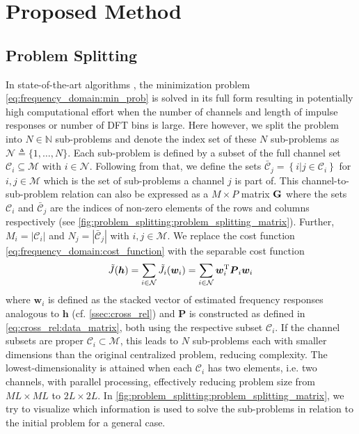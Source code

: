 \documentclass{article}
\newcommand{\hf}{{\bm{h}}}
\newcommand{\wf}{{\bm{w}}}
\newcommand{\aRhof}{{\bm{{P}}}}
\newcommand{\Cset}{\mathcal{C}}
\newcommand{\Csetb}{\bar{\mathcal{C}}}
\newcommand{\Mset}{\mathcal{M}}
\newcommand{\Nset}{\mathcal{N}}
\begin{document}
\section{Proposed Method}
\label{sec:proposed_method}

\subsection{Problem Splitting}
\label{ssec:problem_splitting}
In state-of-the-art algorithms \cite{heNoiseRobustFrequencyDomain2018,habetsOnlineQuasiNewtonAlgorithm2010}, the minimization problem \eqref{eq:frequency_domain:min_prob} is solved in its full form resulting in potentially high computational effort when the number of channels and length of impulse responses or number of DFT bins is large.
Here however, we split the problem into \(N \in \mathbb{N}\) sub-problems and denote the index set of these \(N\) sub-problems as \(\Nset \triangleq \{1,\ldots,N\}\).
Each sub-problem is defined by a subset of the full channel set \(\Cset_i \subseteq \Mset\) with \(i \in \Nset\).
Following from that, we define the sets \(\Csetb_j = \left\{ i \vert j \in \Cset_i \right\}\) for \(i,j \in \Mset\) which is the set of sub-problems a channel  \(j\) is part of.
This channel-to-sub-problem relation can also be expressed as a \(M \times P\) matrix \(\bm{\mathrm{G}}\) where the sets \(\Cset_i\) and \(\Csetb_j\) are the indices of non-zero elements of the rows and columns respectively (see \autoref{fig:problem_splitting:problem_splitting_matrix}).
Further, \(M_i = \left| \Cset_i \right| \) and \(N_j = \left| \Csetb_j \right| \) with \(i,j \in \Mset\). 
We replace the cost function \eqref{eq:frequency_domain:cost_function} with the separable cost function 
\begin{equation}
    \tilde{J}(\hf) = \sum_{i \in \Nset} \tilde{J}_i(\wf_i)  = \sum_{i \in \Nset} \wf_i^\T \aRhof_i \wf_i
    \label{eq:problem_splitting:cost_function}
\end{equation}
where \(\wf_i\) is defined as the stacked vector of estimated frequency responses analogous to \(\hf\) (cf. \autoref{ssec:cross_rel}) and \(\aRhof\) is constructed as defined in \eqref{eq:cross_rel:data_matrix}, both using the respective subset \(\Cset_i\).
If the channel subsets are proper \(\Cset_i \subset \Mset\), this leads to \(N\) sub-problems each with smaller dimensions than the original centralized problem, reducing complexity.
The lowest-dimensionality is attained when each \(\Cset_i\) has two elements, i.e. two channels, with parallel processing, effectively reducing problem size from \(ML \times ML\) to \(2L \times 2L\).
In \autoref{fig:problem_splitting:problem_splitting_matrix}, we try to visualize which information is used to solve the sub-problems in relation to the initial problem for a general case.
\end{document}
